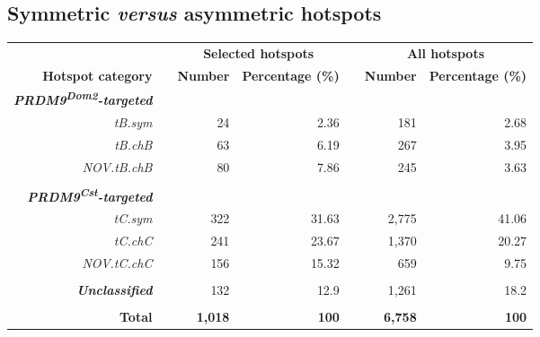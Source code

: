 \subsection{Symmetric \textit{versus} asymmetric hotspots}

\begin{table}[b!]
	\centering
	\begin{adjustbox}{width = 1\textwidth}
		\begin{tabular}{rrrrrrr}

			\toprule
			& & \multicolumn{2}{c}{\textbf{Selected hotspots}} & &  \multicolumn{2}{c}{\textbf{All hotspots}} \\
			\cmidrule{3-4}
			\cmidrule{6-7}
			\textbf{Hotspot category} & & \textbf{Number} & \textbf{Percentage (\%)} & & \textbf{Number} & \textbf{Percentage (\%)} \\

			\cmidrule{1-1}
			\cmidrule{3-4}
			\cmidrule{6-7}

			\textbf{\textit{PRDM9\textsuperscript{Dom2}-targeted}}\\
			\textit{tB.sym}     & & 24    & 2.36  & & 181   & 2.68 \\ 
			\textit{tB.chB}     & & 63    & 6.19  & & 267   & 3.95 \\ 
			\textit{NOV.tB.chB} & & 80    & 7.86  & & 245   & 3.63 \\ 
			\\

			\textbf{\textit{PRDM9\textsuperscript{Cst}-targeted}}\\
			\textit{tC.sym}     & & 322   & 31.63 & & 2,775 & 41.06 \\
			\textit{tC.chC}     & & 241   & 23.67 & & 1,370 & 20.27 \\ 
			\textit{NOV.tC.chC} & & 156   & 15.32 & & 659   & 9.75 \\ 
			\\

			\textbf{\textit{Unclassified}} & & 132 & 12.9 & & 1,261 & 18.2 \\
			\\

			\cmidrule{1-1}
			\cmidrule{3-4}
			\cmidrule{6-7}
			\textbf{Total}      & & \textbf{1,018} & \textbf{100}   & & \textbf{6,758} & \textbf{100} \\
			\bottomrule


\end{tabular}
\end{adjustbox}
\end{table}
